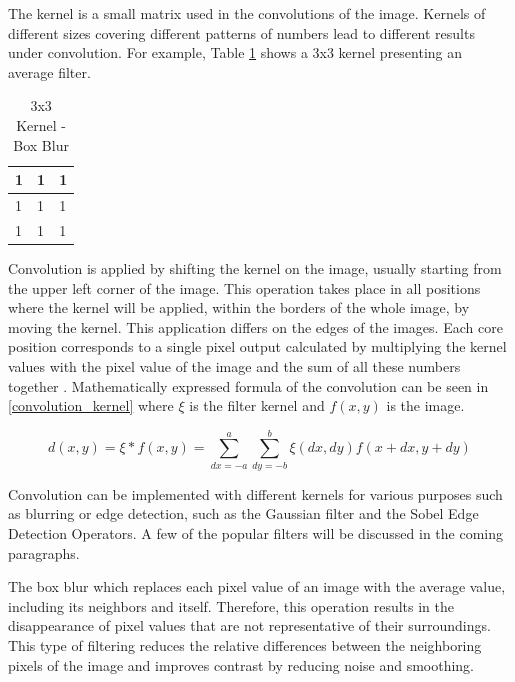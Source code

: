 The kernel is a small matrix used in the convolutions of the image. Kernels of different sizes covering different patterns of numbers lead to different results under convolution. For example, Table \ref{tab:Kernal3_3} shows a 3x3 kernel presenting an average filter.

\begin{table}[htbp]
\begin{center}
\caption{3x3 Kernel - Box Blur}
\vspace{23pt}
      \begin{tabular}{|l|l|l|}
        \hline
        1 & 1 & 1   \\
        \hline
        1 & 1 & 1   \\
        \hline
        1 & 1 & 1   \\
        \hline
      \end{tabular}
\label{tab:Kernal3_3}
\end{center}
\end{table}

Convolution is applied by shifting the kernel on the image, usually starting from the upper left corner of the image. This operation takes place in all positions where the kernel will be applied, within the borders of the whole image, by moving the kernel. This application differs on the edges of the images. Each core position corresponds to a single pixel output calculated by multiplying the kernel values with the pixel value of the image and the sum of all these numbers together \cite{russ2010image}. Mathematically expressed formula of the convolution can be seen in \ref{convolution_kernel} where  \(\xi\) is the filter kernel and \(f(x,y)\) is the image.

\begin{equation} \label{convolution_kernel}
d(x,y) = \xi * f(x,y) = \sum_{dx=-a}^{a} \sum_{dy=-b}^{b} \xi(dx,dy) f(x + dx, y + dy)
\end{equation}

Convolution can be implemented with different kernels for various purposes such as blurring or edge detection, such as the Gaussian filter and the Sobel Edge Detection Operators. A few of the popular filters will be discussed in the coming paragraphs.

The box blur which replaces each pixel value of an image with the average value, including its neighbors and itself. Therefore, this operation results in the disappearance of pixel values that are not representative of their surroundings. This type of filtering reduces the relative differences between the neighboring pixels of the image and improves contrast by reducing noise and smoothing.

